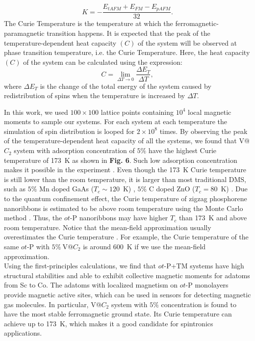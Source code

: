 \documentclass[%
superscriptaddress,
preprint,
showpacs,preprintnumbers,
 amsmath,amssymb,
prb,
]{revtex4-1}
\begin{document}
\begin{equation}
K=-\frac{E_{tAFM}+E_{FM}-E_{pAFM}}{32}.\label{eq:K}
\end{equation}
The Curie Temperature is the temperature at which the ferromagnetic-paramagnetic
transition happens. It is expected that the peak of the temperature-dependent
heat capacity $(C)$ of the system will be observed at phase transition
temperature, i.e. the Curie Temperature. Here, the heat capacity $(C)$
of the system can be calculated using the expression:
\begin{equation}
C=\lim_{\Delta T\rightarrow0}\frac{\Delta E_{T}}{\Delta T},\label{eq:HeatCapacity}
\end{equation}
where $\Delta E_{T}$ is the change of the total energy of the system
caused by redistribution of spins when the temperature is increased
by $\Delta T$.

In this work, we used $100\times100$ lattice points containing $10^{4}$
local magnetic moments to sample our systems. For each system at each
temperature the simulation of spin distribution is looped for $2\times10^{8}$
times. By observing the peak of the temperature-dependent heat capacity
of all the systems, we found that V@$C_{2}$ system with adsorption
concentration of $5\%$ have the highest Curie temperature of 173~K as shown in \textbf{Fig. 6}. Such low adsorption concentration makes it possible in the experiment \cite{Dietl2010NM, Pan2007PRL, Sato2003EPL}. Even though the 173~K Curie temperature is still lower than the room temperature, it is larger than most traditional DMS, such as $5\%$ Mn doped GaAs ($T_c \sim 120$~K) \cite{Dietl2010NM}, $5\%$ C doped ZnO ($T_c = 80$~K) \cite{Pan2007PRL}. Due to the quantum confinement effect, the Curie temperature of zigzag phosphorene nanoribbons is estimated to be above room temperature using the Monte Carlo method \cite{Yang2016PRB}. Thus, the $ot$-P nanoribbons \cite{Zhao2016CPL} may have higher $T_c$ than 173~K and above room temperature. Notice that the mean-field approximation usually overestimates the Curie temperature \cite{Sato2003EPL,Seixas2015PRB}. For example, the Curie temperature of the same $ot$-P with $5\%~$V@$C_{2}$ is around 600~K if we use the mean-field approximation.\\ %


Using the first-principles calculations, we find that $ot$-P+TM systems have high structural
stabilities and able to exhibit collective magnetic moments for adatoms
from Sc to Co. The adatoms with localized magnetism on $ot$-P monolayers provide magnetic active sites, which can be used in sensors for detecting magnetic gas molecules. In particular, V@$C_{2}$ system with $5\%$ concentration is found to have the most stable ferromagnetic ground state. Its Curie temperature can achieve up to 173~K, which makes it a good candidate for spintronics applications.\\
\end{document}
